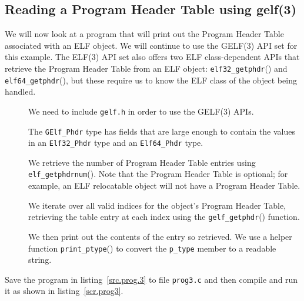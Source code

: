 \documentclass[a4paper]{report}
\makeatletter
\newcommand{\function}[1]{\texttt{#1}()}
\newcommand{\filename}[1]{\texttt{#1}}
\newcommand{\parameter}[1]{\texttt{#1}}
\newcommand{\type}[1]{\texttt{#1}}
\newenvironment{callout}[2][blue]{%
  \begingroup\newcommand{\@cocolor}{#1}%
  \newcommand{\@cogroup}[1]{#2}}{\endgroup}
\newcommand{\@co}[1]{\framebox{\textbf{\color{\@cocolor}#1}}}
\newcommand{\coref}[1]{%
  \hypertarget{\@cogroup.#1.cr}{%
    \hyperlink{\@cogroup.#1.co}{\@co{#1}}}}
\makeatother
\begin{document}
\subsection{Reading a Program Header Table using gelf(3)}
We will now look at a program that will print out the Program Header
Table associated with an ELF object.  We will continue to use the
GELF(3) API set for this example.  The ELF(3) API set also offers two
ELF class-dependent APIs that retrieve the Program Header Table from
an ELF object: \function{elf32\_getphdr} and
\function{elf64\_getphdr}, but these require us to know the ELF class
of the object being handled.

\begin{callout}{prog3}
  
  
  \begin{description}
  \item[\coref{1}] We need to include \filename{gelf.h} in order to
    use the GELF(3) APIs.
  \item[\coref{2}] The \type{GElf\_Phdr} type has fields that are
    large enough to contain the values in an \type{Elf32\_Phdr} type
    and an \type{Elf64\_Phdr} type.
  \item[\coref{3}] We retrieve the number of Program Header Table
    entries using \function{elf\_getphdrnum}.  Note that the Program
    Header Table is optional; for example, an ELF relocatable object
    will not have a Program Header Table.
  \item[\coref{4} \coref{5}] We iterate over all valid indices for the
    object's Program Header Table, retrieving the table entry at each
    index using the \function{gelf\_getphdr} function.
  \item[\coref{6} \coref{7}] We then print out the contents of the
    entry so retrieved.  We use a helper function
    \function{print\_ptype} to convert the \parameter{p\_type} member
    to a readable string.
  \end{description}
\end{callout}

Save the program in listing~\vref{src.prog.3} to file \filename{prog3.c} and
then compile and run it as shown in listing~\vref{scr.prog3}.
\end{document}
